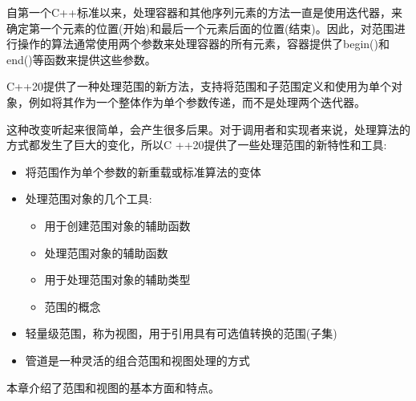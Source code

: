 自第一个C++标准以来，处理容器和其他序列元素的方法一直是使用迭代器，来确定第一个元素的位置(开始)和最后一个元素后面的位置(结束)。因此，对范围进行操作的算法通常使用两个参数来处理容器的所有元素，容器提供了begin()和end()等函数来提供这些参数。

C++20提供了一种处理范围的新方法，支持将范围和子范围定义和使用为单个对象，例如将其作为一个整体作为单个参数传递，而不是处理两个迭代器。

这种改变听起来很简单，会产生很多后果。对于调用者和实现者来说，处理算法的方式都发生了巨大的变化，所以C
++20提供了一些处理范围的新特性和工具:


\begin{itemize}
\item
将范围作为单个参数的新重载或标准算法的变体

\item
处理范围对象的几个工具:
\begin{itemize}
\item
用于创建范围对象的辅助函数

\item
处理范围对象的辅助函数

\item
用于处理范围对象的辅助类型

\item
范围的概念
\end{itemize}

\item
轻量级范围，称为视图，用于引用具有可选值转换的范围(子集)

\item
管道是一种灵活的组合范围和视图处理的方式
\end{itemize}

本章介绍了范围和视图的基本方面和特点。





